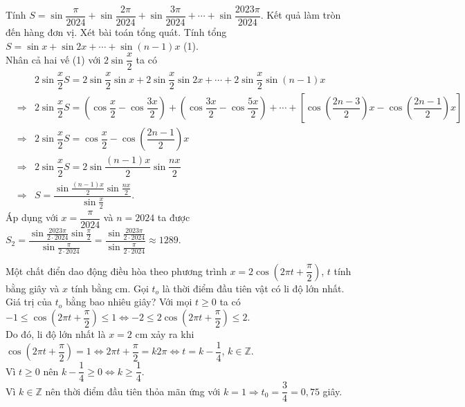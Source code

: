 \begin{ex}%
	Tính $S= \sin \dfrac{\pi}{2024} + \sin \dfrac{2\pi}{2024} + \sin \dfrac{3\pi}{2024} + \cdots + \sin \dfrac{2023\pi}{2024}$. Kết quả làm tròn đến hàng đơn vị.
	\loigiai
	{
	Xét bài toán tổng quát. Tính tổng
	$S= \sin x + \sin 2x + \cdots + \sin (n-1)x$ \quad (1).\\
	Nhân cả hai vế (1) với $2 \sin \dfrac{x}{2}$ ta có\\
	\begin{eqnarray*}
		 & & 2 \sin \dfrac{x}{2} S = 2 \sin \dfrac{x}{2} \sin x + 2 \sin \dfrac{x}{2} \sin 2x + \cdots + 2 \sin \dfrac{x}{2} \sin (n-1)x\\
		 & \Rightarrow & 2 \sin \dfrac{x}{2} S = \left( \cos \dfrac{x}{2} - \cos \dfrac{3x}{2} \right) + \left( \cos \dfrac{3x}{2} - \cos \dfrac{5x}{2} \right) + \cdots + \left[ \cos \left( \dfrac{2n-3}{2} \right)x - \cos \left( \dfrac{2n-1}{2} \right)x \right] \\
		 & \Rightarrow & 2 \sin \dfrac{x}{2} S = \cos \dfrac{x}{2} - \cos \left( \dfrac{2n-1}{2} \right)x \\
		 & \Rightarrow & 2 \sin \dfrac{x}{2} S = 2 \sin \dfrac{(n-1)x}{2} \sin \dfrac{nx}{2} \\
		 & \Rightarrow & S= \dfrac{\sin \tfrac{(n-1)x}{2} \sin \tfrac{nx}{2}}{\sin \tfrac{x}{2}}.
	\end{eqnarray*}
	Áp dụng với $x= \dfrac{\pi}{2024}$ và $n=2024$ ta được
	$S_2 = \dfrac{\sin \tfrac{2023 \pi}{2 \cdot 2024} \sin \tfrac{\pi}{2}}{\sin \tfrac{\pi}{2 \cdot 2024}} = \dfrac{\sin \tfrac{2023 \pi}{2 \cdot 2024}}{\sin \tfrac{\pi}{2 \cdot 2024}} \approx 1289$.
	}
\end{ex}

\begin{ex}%
	Một chất điển dao động điều hòa theo phương trình $x= 2 \cos \left( 2\pi t + \dfrac{\pi}{2} \right)$, $t$ tính bằng giây và $x$ tính bằng cm. Gọi $t_o$ là thời điểm đầu tiên vật có li độ lớn nhất. Giá trị của $t_o$ bằng bao nhiêu giây?
	\loigiai
	{
	Với mọi $t \ge 0$ ta có $-1 \le \cos \left( 2\pi t + \dfrac{\pi}{2} \right) \le 1 \Leftrightarrow -2 \le 2 \cos \left( 2\pi t + \dfrac{\pi}{2} \right) \le 2$.\\
	Do đó, li độ lớn nhất là $x=2$ cm xảy ra khi \\
	$ \cos \left( 2\pi t + \dfrac{\pi}{2} \right) =1 \Leftrightarrow 2\pi t + \dfrac{\pi}{2} = k2\pi \Leftrightarrow t = k - \dfrac{1}{4}$, $k \in \mathbb{Z}$.\\
	Vì $t \ge 0$ nên $k- \dfrac{1}{4} \ge 0 \Leftrightarrow k \ge \dfrac{1}{4}$.\\
	Vì $k \in \mathbb{Z}$ nên thời điểm đầu tiên thỏa mãn ứng với $k=1 \Rightarrow t_0 = \dfrac{3}{4} = 0{,}75$ giây.
	}
\end{ex}

